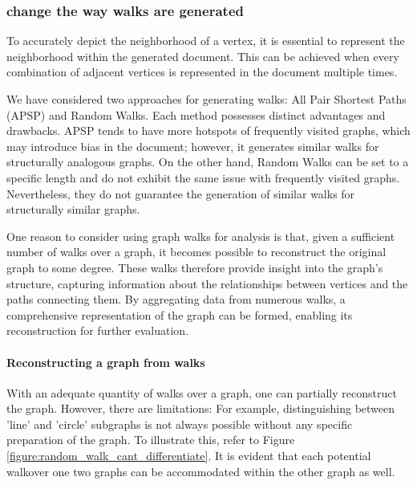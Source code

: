 \subsubsection{change the way walks are generated}
To accurately depict the neighborhood of a vertex, it is essential to represent the neighborhood within the generated document. This can be achieved when every combination of adjacent vertices is represented in the document multiple times.

We have considered two approaches for generating walks: All Pair Shortest Paths (APSP) and Random Walks. Each method possesses distinct advantages and drawbacks. APSP tends to have more hotspots of frequently visited graphs, which may introduce bias in the document; however, it generates similar walks for structurally analogous graphs. On the other hand, Random Walks can be set to a specific length and do not exhibit the same issue with frequently visited graphs. Nevertheless, they do not guarantee the generation of similar walks for structurally similar graphs.

One reason to consider using graph walks for analysis is that, given a sufficient number of walks over a graph, it becomes possible to reconstruct the original graph to some degree. These walks therefore provide insight into the graph's structure, capturing information about the relationships between vertices and the paths connecting them. By aggregating data from numerous walks, a comprehensive representation of the graph can be formed, enabling its reconstruction for further evaluation.

\paragraph{Reconstructing a graph from walks}
With an adequate quantity of walks over a graph, one can partially reconstruct the graph. However, there are limitations: For example, distinguishing between 'line' and 'circle' subgraphs is not always possible without any specific preparation of the graph. To illustrate this, refer to Figure \ref{figure:random_walk_cant_differentiate}. It is evident that each potential walkover one two graphs can be accommodated within the other graph as well.

